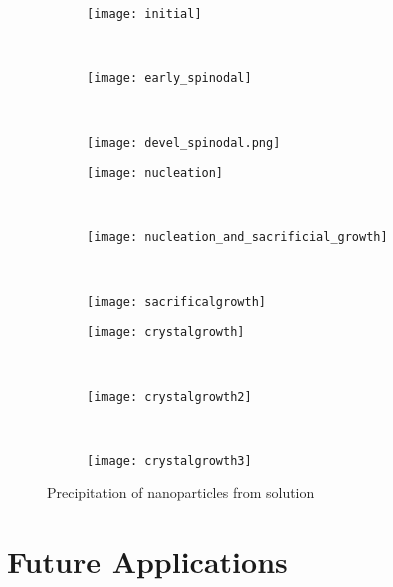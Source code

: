\begin{figure}
    \centering
    \begin{subfigure}[b]{0.3\textwidth}
        \texttt{[image: initial]}
        \label{fig:initial}
        \caption{}
    \end{subfigure}
    ~
    \begin{subfigure}[b]{0.3\textwidth}
        \texttt{[image: early\_spinodal]}
        \label{fig:early_spinodal}
        \caption{}
    \end{subfigure}
    ~
    \begin{subfigure}[b]{0.3\textwidth}
        \texttt{[image: devel\_spinodal.png]}
        \label{fig:devel_spinodal}
        \caption{}
    \end{subfigure}

    \vspace{0.5cm}
    \begin{subfigure}[b]{0.3\textwidth}
        \texttt{[image: nucleation]}
        \label{fig:nucleation}
        \caption{}
    \end{subfigure}
    ~
    \begin{subfigure}[b]{0.3\textwidth}
        \texttt{[image: nucleation\_and\_sacrificial\_growth]}
        \label{fig:nucleation_and_growth}
        \caption{} 
    \end{subfigure}
    ~
    \begin{subfigure}[b]{0.3\textwidth}
        \texttt{[image: sacrificalgrowth]}
        \label{fig:sacrifical_growth}
        \caption{}
    \end{subfigure}
    
    \vspace{0.5cm}
    \begin{subfigure}[b]{0.3\textwidth}
        \texttt{[image: crystalgrowth]}
        \label{fig:crystalgrowth}
        \caption{}
    \end{subfigure}
    ~
    \begin{subfigure}[b]{0.3\textwidth}
        \texttt{[image: crystalgrowth2]}
        \label{fig:crystalgrowth2}
        \caption{}
    \end{subfigure}
    ~ 
    \begin{subfigure}[b]{0.3\textwidth}
        \texttt{[image: crystalgrowth3]}
        \label{fig:crystalgrowth3}
        \caption{}
    \end{subfigure}
    \label{fig:preciptiation}
    \caption{Precipitation of nanoparticles from solution}
\end{figure}


\section{Future Applications} %

